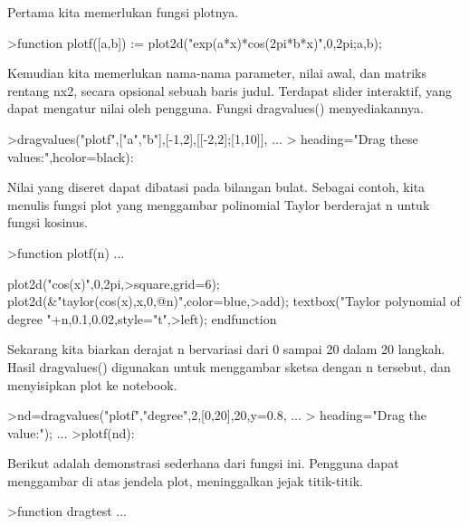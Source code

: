 \documentclass[a4paper,10pt]{article}
\begin{document}
\begin{eulernotebook}
\begin{eulercomment}
\begin{eulercomment}
\begin{eulercomment}
\begin{eulercomment}
\begin{eulercomment}
\begin{eulercomment}
\begin{eulercomment}
Pertama kita memerlukan fungsi plotnya.
\end{eulercomment}
\begin{eulerprompt}
>function plotf([a,b]) := plot2d("exp(a*x)*cos(2pi*b*x)",0,2pi;a,b);
\end{eulerprompt}
\begin{eulercomment}
Kemudian kita memerlukan nama-nama parameter, nilai awal, dan matriks rentang nx2,
secara opsional sebuah baris judul. Terdapat slider interaktif, yang dapat mengatur
nilai oleh pengguna. Fungsi dragvalues() menyediakannya.
\end{eulercomment}
\begin{eulerprompt}
>dragvalues("plotf",["a","b"],[-1,2],[[-2,2];[1,10]], ...
>  heading="Drag these values:",hcolor=black):
\end{eulerprompt}
\begin{eulercomment}
Nilai yang diseret dapat dibatasi pada bilangan bulat. Sebagai contoh, kita menulis
fungsi plot yang menggambar polinomial Taylor berderajat n untuk fungsi kosinus.
\end{eulercomment}
\begin{eulerprompt}
>function plotf(n) ...
\end{eulerprompt}
\begin{eulerudf}
  plot2d("cos(x)",0,2pi,>square,grid=6);
  plot2d(&"taylor(cos(x),x,0,@n)",color=blue,>add);
  textbox("Taylor polynomial of degree "+n,0.1,0.02,style="t",>left);
  endfunction
\end{eulerudf}
\begin{eulercomment}
Sekarang kita biarkan derajat n bervariasi dari 0 sampai 20 dalam 20 langkah. Hasil
dragvalues() digunakan untuk menggambar sketsa dengan n tersebut, dan menyisipkan plot
ke notebook.
\end{eulercomment}
\begin{eulerprompt}
>nd=dragvalues("plotf","degree",2,[0,20],20,y=0.8, ...
>   heading="Drag the value:"); ...
>plotf(nd):
\end{eulerprompt}
\begin{eulercomment}
Berikut adalah demonstrasi sederhana dari fungsi ini. Pengguna dapat menggambar di
atas jendela plot, meninggalkan jejak titik-titik.
\end{eulercomment}
\begin{eulerprompt}
>function dragtest ...
\end{eulerprompt}
\begin{eulerudf}

\end{eulerudf}
\end{eulercomment}
\end{eulercomment}
\end{eulercomment}
\end{eulercomment}
\end{eulercomment}
\end{eulercomment}
\end{eulernotebook}
\end{document}
